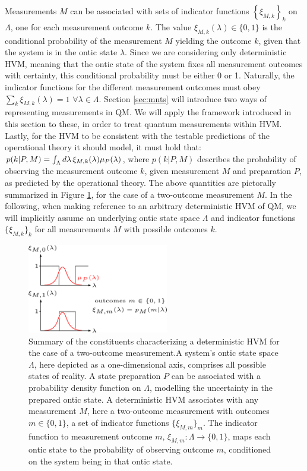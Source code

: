 Measurements $M$ can be associated with sets of indicator functions $\left\{ \xi_{M,k}\right\} _{k}$ on $\Lambda$, one for each measurement outcome $k$. The value $\xi_{M,k}(\lambda)\in\{0,1\}$ is the conditional probability of the measurement $M$ yielding the outcome $k$, given that the system is in the ontic state $\lambda$. Since we are considering only deterministic HVM, meaning that the ontic state of the system fixes all measurement outcomes with certainty, this conditional probability must be either 0 or 1. Naturally, the indicator functions for the different measurement outcomes must obey $\sum_{k}\xi_{M,k}(\lambda)=1$ $\forall\lambda\in\Lambda$. Section \ref{sec:mnts} will introduce two ways of representing measurements in QM. We will apply the framework introduced in this section to these, in order to treat quantum measurements within HVM. Lastly, for the HVM to be consistent with the testable predictions of the operational theory it should model, it must hold that: $p(k\vert P,M)=\int_{\Lambda}d\lambda\thinspace\xi_{M,k}(\lambda)\mu_{P}(\lambda)$, where $p(k\vert P,M)$ describes the probability of observing the measurement outcome $k$, given measurement $M$ and preparation $P$, as predicted by the operational theory. The above quantities are pictorally summarized in Figure \ref{fig:hvm}, for the case of a two-outcome measurement $M$. In the following, when making reference to an arbitrary deterministic HVM of QM, we will implicitly assume an underlying ontic state space $\Lambda$ and indicator functions $\{\xi_{M,k}\}_{k}$ for all measurements $M$ with possible outcomes $k$.

\begin{figure}
    \centering
    \includegraphics[width=0.55\textwidth]{images/hvm.png}
    \caption{Summary of the constituents characterizing a deterministic HVM for the case of a two-outcome measurement.\hfill\break A system's ontic state space $\Lambda$, here depicted as a one-dimensional axis, comprises all possible states of reality. A state preparation $P$ can be associated with a probability density function on $\Lambda$, modelling the uncertainty in the prepared ontic state. A deterministic HVM associates with any measurement $M$, here a two-outcome measurement with outcomes $m\in\{0,1\}$, a set of indicator functions $\{\xi_{M,m}\}_m$. The indicator function to measurement outcome $m$, ${\xi_{M,m}:\Lambda\rightarrow\{0,1\}}$, maps each ontic state to the probability of observing outcome $m$, conditioned on the system being in that ontic state.}
    \label{fig:hvm}
\end{figure}

